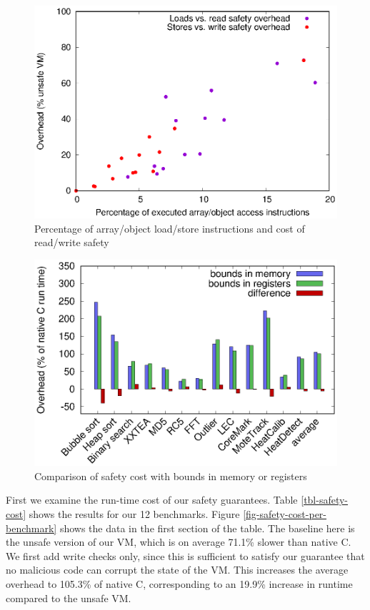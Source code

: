 \begin{figure}
\centering
\includegraphics[width=\mygraphsize]{safety-ld-st-percentage-vs-overhead.eps}
\caption{Percentage of array/object load/store instructions and cost of read/write safety}
\label{fig-safety-ld-st-percentage-vs-overhead}
\end{figure}

\begin{figure}
\centering
\includegraphics[width=\mygraphsize]{safety-cost-diff-using-regs.eps}
\caption{Comparison of safety cost with bounds in memory or registers}
\label{fig-safety-cost-memory-or-registers}
\end{figure}

First we examine the run-time cost of our safety guarantees. Table \ref{tbl-safety-cost} shows the results for our 12 benchmarks. Figure \ref{fig-safety-cost-per-benchmark} shows the data in the first section of the table. The baseline here is the unsafe version of our VM, which is on average 71.1\% slower than native C. We first add write checks only, since this is sufficient to satisfy our guarantee that no malicious code can corrupt the state of the VM. This increases the average overhead to 105.3\% of native C, corresponding to an 19.9\% increase in runtime compared to the unsafe VM.

